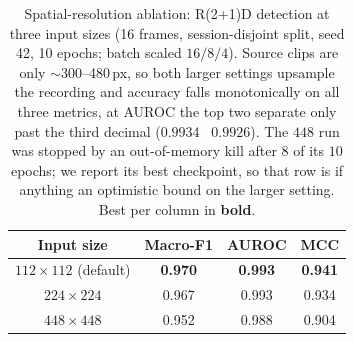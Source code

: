 \begin{table}[tb]
\centering
\caption{Spatial-resolution ablation: R(2+1)D detection at three input sizes
(16 frames, session-disjoint split, seed 42, 10 epochs; batch scaled $16/8/4$). Source clips are only $\sim$300--480\,px, so both larger settings upsample the
recording and accuracy falls monotonically on all three metrics, at AUROC the top
two separate only past the third decimal ($0.9934$ \vs\ $0.9926$). The $448$ run was
stopped by an out-of-memory kill after $8$ of its $10$ epochs; we report its best
checkpoint, so that row is if anything an optimistic bound on the larger setting. Best per column in \textbf{bold}.}
\label{tab:resolution}
\setlength{\tabcolsep}{8pt}
\renewcommand{\arraystretch}{1.12}
\begin{tabular}{@{}c c c c@{}}
\toprule
\textbf{Input size} & \textbf{Macro-F1} & \textbf{AUROC} & \textbf{MCC} \\
\midrule
$112\times112$ (default) & \textbf{0.970} & \textbf{0.993} & \textbf{0.941} \\
$224\times224$           & 0.967 & 0.993 & 0.934 \\
$448\times448$           & 0.952 & 0.988 & 0.904 \\
\bottomrule
\end{tabular}
\end{table}

\begin{table}[tb]
\centering
\caption{Per-class breakdown at 5-class grading, video (R(2+1)D) \vs\ the EEG GRU
($n$ is the held-out clip count). Both are strong on the common classes and weak on
the rare high-severity stages, and the failure is sharper for EEG: Stage\,4--5
F1 of 0.20 / 0.12 against video's 0.36 / 0.42. Over all five classes the run-level
MCC is 0.830 for video against 0.702 for EEG. The counts differ slightly between
the two columns because the EEG models were retrained on a regenerated clip corpus,
so the held-out sets are not clip-identical.}
\label{tab:perclass}
\setlength{\tabcolsep}{3.5pt}
\renewcommand{\arraystretch}{1.1}
\end{table}

